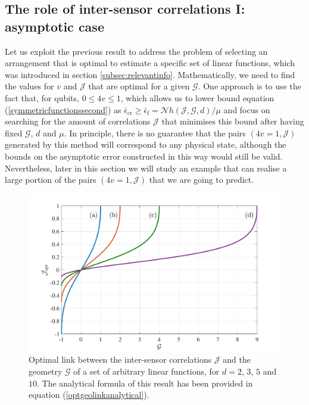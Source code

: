 \subsection{The role of inter-sensor correlations I: asymptotic case}
\label{subsec:intersensorasymp}

Let us exploit the previous result to address the problem of selecting an arrangement that is optimal to estimate a specific set of linear functions, which was introduced in section \ref{subsec:relevantinfo}. Mathematically, we need to find the values for $v$ and $\mathcal{J}$ that are optimal for a given $\mathcal{G}$. One approach is to use the fact that, for qubits, $0\leqslant 4v\leqslant 1$, which allows us to lower bound equation (\ref{symmetricfunctionssecond}) as $\bar{\epsilon}_{\mathrm{cr}} \geqslant \bar{\epsilon}_{\mathrm{f}} = \mathcal{N}h\left(\mathcal{J}, \mathcal{G}, d\right)/\mu$ and focus on searching for the amount of correlations $\mathcal{J}$ that minimises this bound after having fixed $\mathcal{G}$, $d$ and $\mu$. In principle, there is no guarantee that the pairs $(4v = 1, \mathcal{J})$ generated by this method will correspond to any physical state, although the bounds on the asymptotic error constructed in this way would still be valid. Nevertheless, later in this section we will study an example that can realise a large portion of the pairs $(4v = 1, \mathcal{J})$ that we are going to predict.

\begin{figure}[t]
\centering
\includegraphics[trim={1cm 0.1cm 1.5cm 0.5cm},clip,width=14.75cm]{pictures/ch6_fig1}
	\caption[Optimal link between correlations and geometry of the functions]{Optimal link between the inter-sensor correlations $\mathcal{J}$ and the geometry $\mathcal{G}$ of a set of arbitrary linear functions, for $d=2$, $3$, $5$ and $10$. The analytical formula of this result has been provided in equation (\ref{optgeolinkanalytical}).}
\label{linkgeoent}
\end{figure}

